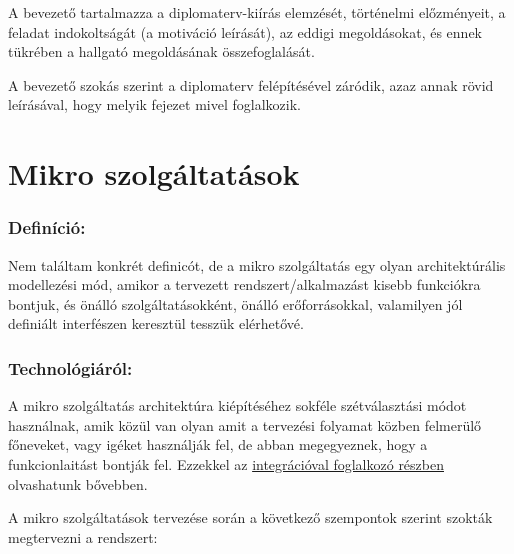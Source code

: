 \documentclass[11pt,magyar,a4paper,oneside,]{report}
\begin{document}
A bevezető tartalmazza a diplomaterv-kiírás elemzését, történelmi
előzményeit, a feladat indokoltságát (a motiváció leírását), az eddigi
megoldásokat, és ennek tükrében a hallgató megoldásának összefoglalását.

A bevezető szokás szerint a diplomaterv felépítésével záródik, azaz
annak rövid leírásával, hogy melyik fejezet mivel foglalkozik.

\chapter{Mikro szolgáltatások}\label{mikro-szolguxe1ltatuxe1sok}

\subsection{Definíció:}\label{definuxedciuxf3}

Nem találtam konkrét definicót, de a mikro szolgáltatás egy olyan
architektúrális modellezési mód, amikor a tervezett
rendszert/alkalmazást kisebb funkciókra bontjuk, és önálló
szolgáltatásokként, önálló erőforrásokkal, valamilyen jól definiált
interfészen keresztül tesszük elérhetővé.

\subsection{Technológiáról:}\label{technoluxf3giuxe1ruxf3l}

A mikro szolgáltatás architektúra kiépítéséhez sokféle szétválasztási
módot használnak, amik közül van olyan amit a tervezési folyamat közben
felmerülő főneveket, vagy igéket használják fel, de abban megegyeznek,
hogy a funkcionlaitást bontják fel. Ezzekkel az
\href{Integrációs-minták}{integrációval foglalkozó részben} olvashatunk
bővebben.

A mikro szolgáltatások tervezése során a következő szempontok szerint
szokták megtervezni a rendszert:
\end{document}
